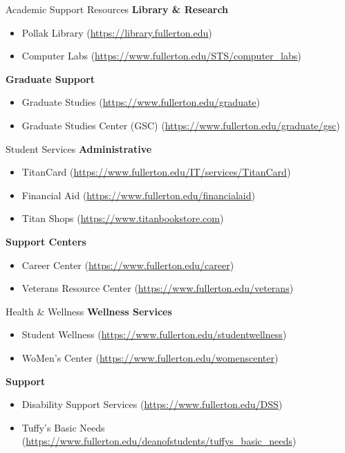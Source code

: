 \documentclass[10pt]{beamer}
\begin{document}
\begin{frame}{Academic Support Resources}
\textbf{Library \& Research}
\begin{itemize}
  \item Pollak Library \small(\url{https://library.fullerton.edu})
  \item Computer Labs \small(\url{https://www.fullerton.edu/STS/computer_labs})
\end{itemize}

\textbf{Graduate Support}
\begin{itemize}
  \item Graduate Studies \small(\url{https://www.fullerton.edu/graduate})
  \item Graduate Studies Center (GSC) \small(\url{https://www.fullerton.edu/graduate/gsc})
\end{itemize}
\end{frame}

\begin{frame}{Student Services}
\textbf{Administrative}
\begin{itemize}
  \item TitanCard \small(\url{https://www.fullerton.edu/IT/services/TitanCard})
  \item Financial Aid \small(\url{https://www.fullerton.edu/financialaid})
  \item Titan Shops \small(\url{https://www.titanbookstore.com})
\end{itemize}

\textbf{Support Centers}
\begin{itemize}
  \item Career Center \small(\url{https://www.fullerton.edu/career})
  \item Veterans Resource Center \small(\url{https://www.fullerton.edu/veterans})
\end{itemize}
\end{frame}

\begin{frame}{Health \& Wellness}
\textbf{Wellness Services}
\begin{itemize}
  \item Student Wellness \small(\url{https://www.fullerton.edu/studentwellness})
  \item WoMen's Center \small(\url{https://www.fullerton.edu/womenscenter})
\end{itemize}

\textbf{Support}
\begin{itemize}
  \item Disability Support Services \small(\url{https://www.fullerton.edu/DSS})
  \item Tuffy's Basic Needs \small(\url{https://www.fullerton.edu/deanofstudents/tuffys_basic_needs})
\end{itemize}
\end{frame}
\end{document}
